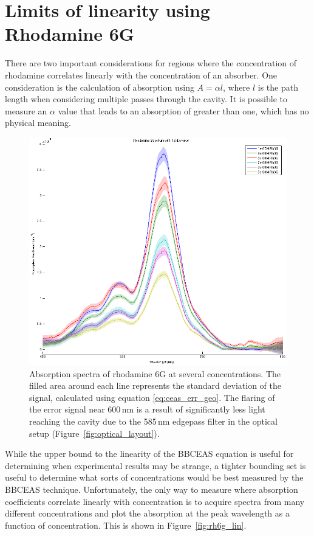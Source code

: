 \section{Limits of linearity using Rhodamine 6G}\label{sec:rhodamine}

There are two important considerations for regions where the concentration of
rhodamine correlates linearly with the concentration of an absorber. One
consideration is the calculation of absorption using $A = \alpha  l$, where $l$
is the path length when considering multiple passes through the cavity.  It is
possible to measure an $\alpha$ value that leads to an absorption of greater
than one, which has no physical meaning.

\begin{figure}
\begin{center}
\includegraphics[width=\textwidth]{figures/Rh6G_absorption_cross_section_with_error}
\end{center}
\caption{Absorption spectra of rhodamine 6G at several concentrations. The filled area around each line represents the standard deviation of the signal, calculated using equation \eqref{eq:ceas_err_geo}. The flaring of the error signal near 600\,nm is a result of significantly less light reaching the cavity due to the 585\,nm edgepass filter in the optical setup (Figure~\ref{fig:optical_layout}).}
\label{fig:rh6g}
\end{figure}


While the upper bound to the linearity of the \ac{BBCEAS} equation is useful
for determining when experimental results may be strange, a tighter bounding
set is useful to determine what sorts of concentrations would be best measured
by the \ac{BBCEAS} technique. Unfortunately, the only way to measure where
absorption coefficients correlate linearly with concentration is to acquire
spectra from many different concentrations and plot the absorption at the peak
wavelength as a function of concentration. This is shown in
Figure~\ref{fig:rh6g_lin}.

